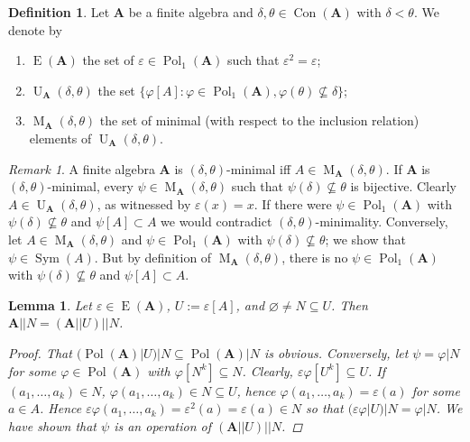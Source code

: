 \documentclass{amsart}
\theoremstyle{plain}
\newtheorem{lemma}[theorem]{Lemma}
\theoremstyle{definition}
\newtheorem{definition}[theorem]{Definition}
\theoremstyle{remark}
\newtheorem{remark}[theorem]{Remark}
\def\phi{\varphi}
\def\epsilon{\varepsilon}
\DeclareMathOperator{\Con}{Con}
\DeclareMathOperator{\Pol}{Pol}
\DeclareMathOperator{\Sym}{Sym}
\DeclareMathOperator{\Id}{E}
\DeclareMathOperator{\U}{U}
\DeclareMathOperator{\M}{M}
\begin{document}
\begin{definition}
    Let $\mathbf{A}$ be a finite algebra and $\delta, \theta \in \Con(\mathbf{A})$ with $\delta < \theta$. 
    We denote by
    \begin{enumerate}
        \item $\Id(\mathbf{A})$ the set of $ \epsilon \in \Pol_1(\mathbf{A})$ such that $\epsilon^2 = \epsilon$; 
        \item $\U_{\mathbf{A}}(\delta, \theta)$ the set $\{\phi[A] : \phi \in \Pol_1(\mathbf{A}), \phi(\theta) \nsubseteq \delta\}$; 
        \item $\M_{\mathbf{A}}(\delta, \theta)$ the set of minimal (with respect to the inclusion relation) elements of $\U_{\mathbf{A}}(\delta, \theta)$. 
    \end{enumerate}
\end{definition}

\begin{remark}
    A finite algebra $\mathbf{A}$ is $(\delta, \theta)$-minimal iff $A \in \M_{\mathbf{A}}(\delta, \theta)$. 
    If $\mathbf{A}$ is $(\delta, \theta)$-minimal, every $\psi \in \M_{\mathbf{A}}(\delta, \theta)$ such that $\psi(\delta) \nsubseteq \theta$ is bijective. 
    Clearly $A \in \U_{\mathbf{A}}(\delta, \theta)$, as witnessed by $\epsilon(x)=x$. 
    If there were $\psi \in \Pol_1(\mathbf{A})$ with $\psi(\delta) \nsubseteq \theta$ and $\psi[A] \subset A$ we would contradict $(\delta, \theta)$-minimality. 
    Conversely, let $A \in \M_{\mathbf{A}}(\delta, \theta)$ and $\psi \in \Pol_1(\mathbf{A})$ with $\psi(\delta) \nsubseteq \theta$; 
    we show that $\psi \in \Sym(A)$. 
    But by definition of $\M_{\mathbf{A}}(\delta, \theta)$, there is no $\psi \in \Pol_1(\mathbf{A})$ with $\psi(\delta) \nsubseteq \theta$ and $\psi[A] \subset A$. 
\end{remark}


\begin{lemma}
    \label{lemma_ex}
    Let $\epsilon \in \Id(\mathbf{A})$, $U:=\epsilon[A]$, and $\varnothing \neq N \subseteq U$.  
    Then $\mathbf{A}||N = (\mathbf{A}||U)||N$. 
    \begin{proof}
        That $(\Pol(\mathbf{A})|U)|N \subseteq \Pol(\mathbf{A})|N$ is obvious. 
        Conversely, let $\psi=\phi|N$ for some $\phi \in \Pol(\mathbf{A})$ with $\phi[N^k] \subseteq N$. 
        Clearly, $\epsilon \phi [U^k] \subseteq U$. 
        If $(a_1, \ldots, a_k) \in N$, $\phi(a_1, \ldots, a_k) \in N \subseteq U$, hence $\phi(a_1, \ldots, a_k) = \epsilon(a)$ for some $a \in A$. 
        Hence $\epsilon \phi(a_1, \ldots, a_k) = \epsilon^2(a)=\epsilon(a) \in N$ so that $(\epsilon \phi |U )|N = \phi|N$. 
        We have shown that $\psi$ is an operation of $(\mathbf{A}||U)||N$. 
    \end{proof}
\end{lemma}
\end{document}
